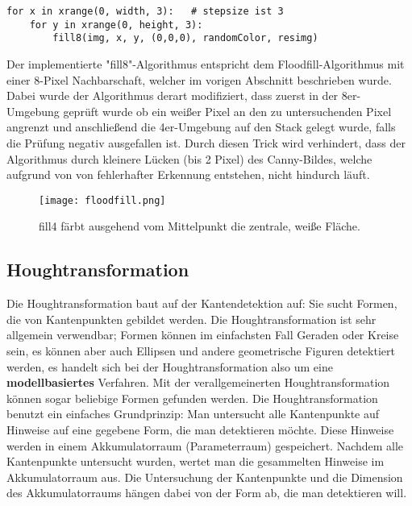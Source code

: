 \begin{lstlisting}
for x in xrange(0, width, 3):   # stepsize ist 3
	for y in xrange(0, height, 3):
		fill8(img, x, y, (0,0,0), randomColor, resimg)
\end{lstlisting}

Der implementierte "fill8"-Algorithmus entspricht dem Floodfill-Algorithmus mit einer 8-Pixel Nachbarschaft, welcher im vorigen Abschnitt beschrieben wurde. Dabei wurde der Algorithmus derart modifiziert, dass zuerst in der 8er-Umgebung geprüft wurde ob ein weißer Pixel an den zu untersuchenden Pixel angrenzt und anschließend die 4er-Umgebung auf den Stack gelegt wurde, falls die Prüfung negativ ausgefallen ist. Durch diesen Trick wird verhindert, dass der Algorithmus durch kleinere Lücken (bis 2 Pixel) des Canny-Bildes, welche aufgrund von von fehlerhafter Erkennung entstehen, nicht hindurch läuft.

\begin{figure}[H]
  \begin{center}
    \texttt{[image: floodfill.png]}
    \caption{fill4 färbt ausgehend vom Mittelpunkt die zentrale, weiße Fläche.}
    \label{fig:floodfill}
  \end{center}
\end{figure}

	\subsection {Houghtransformation}
\cite{ThomasBraeunl1995}
Die Houghtransformation baut auf der Kantendetektion auf: Sie sucht Formen, die von Kantenpunkten gebildet werden.
Die Houghtransformation ist sehr allgemein verwendbar; Formen können im einfachsten Fall Geraden oder Kreise sein, es können aber auch Ellipsen und andere geometrische Figuren detektiert werden, es handelt sich bei der Houghtransformation also um eine \textbf{modellbasiertes} Verfahren.
Mit der verallgemeinerten Houghtransformation können sogar beliebige Formen gefunden werden.
Die Houghtransformation benutzt ein einfaches Grundprinzip: Man untersucht alle Kantenpunkte auf Hinweise auf eine gegebene Form, die man detektieren möchte. Diese Hinweise werden in einem Akkumulatorraum (Parameterraum) gespeichert. Nachdem alle Kantenpunkte untersucht wurden, wertet man die gesammelten Hinweise im Akkumulatorraum aus.
Die Untersuchung der Kantenpunkte und die Dimension des Akkumulatorraums hängen dabei von der Form ab, die man detektieren will.
